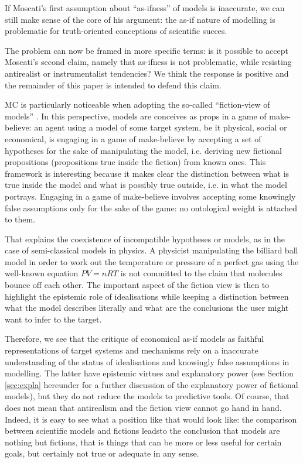\documentclass[a4paper,11pt]{article}
\theoremstyle{definition}
\begin{document}
If Moscati's first assumption about ``as-ifness'' of models is inaccurate, we can still make sense of the core of his argument: the as-if nature of modelling is problematic for truth-oriented conceptions of scientific succes.

The problem can now be framed in more specific terms: is it possible to accept Moscati's second claim, namely that as-ifness is not problematic, while resisting antirealist or instrumentalist tendencies? We think the response is positive and the remainder of this paper is intended to defend this claim.

MC is particularly noticeable when adopting the so-called ``fiction-view of models'' \citep{Frigg2016, Frigg2020, Toon2012}. In this perspective, models are conceives as props in a game of make-believe: an agent using a model of some target system, be it physical, social or economical, is engaging in a game of make-believe by accepting a set of hypotheses for the sake of manipulating the model, i.e. deriving new fictional propositions (propositions true inside the fiction) from known ones. This framework is interesting because it makes clear the distinction between what is true inside the model and what is possibly true outside, i.e. in what the model portrays. Engaging in a game of make-believe involves accepting some knowingly false assumptions only for the sake of the game: no ontological weight is attached to them.

That explains the coexistence of incompatible hypotheses or models, as in the case of semi-classical models in physics. A physicist manipulating the billiard ball model in order to work out the temperature or pressure of a perfect gas using the well-known equation $PV=nRT$ is not committed to the claim that molecules bounce off each other. The important aspect of the fiction view is then to highlight the epistemic role of idealisations while keeping a distinction between what the model describes literally and what are the conclusions the user might want to infer to the target.

Therefore, we see that the critique of economical as-if models as faithful representations of target systems and mechanisms rely on a inaccurate understanding of the status of idealisations and knowingly false assumptions in modelling. The latter have epistemic virtues and explanatory power (see Section \ref{sec:expla} hereunder for a further discussion of the explanatory power of fictional models), but they do not reduce the models to predictive tools. Of course, that does not mean that antirealism and the fiction view cannot go hand in hand. Indeed, it is easy to see what a position like that would look like: the comparison between scientific models and fictions leadsto the conclusion that models are nothing but fictions, that is things that can be more or less useful for certain goals, but certainly not true or adequate in any sense.
\end{document}

